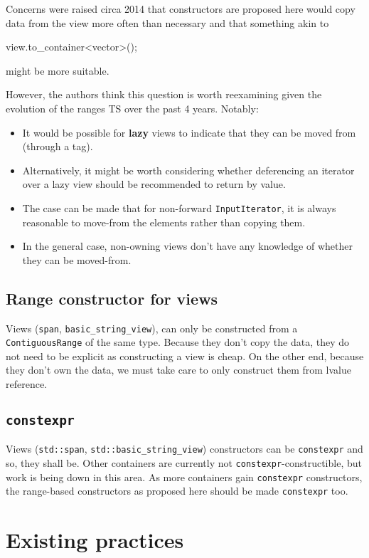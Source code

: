 \documentclass{wg21}
\newcommand{\cc}[1]{\texttt{#1}}
\begin{document}
Concerns were raised circa 2014 that constructors are proposed here would copy data from the view more often than necessary and that something akin to
\begin{codeblock}
view.to_container<vector>();
\end{codeblock}
might be more suitable.

However, the authors think this question is worth reexamining given the evolution of the ranges TS over the past 4 years.
Notably:
\begin{itemize}
	\item It would be possible for \textbf{lazy} views to indicate that they can be moved from (through a tag).
	\item Alternatively, it might be worth considering whether deferencing an iterator over a lazy view should be recommended to return by value.
	\item The case can be made that for non-forward \cc{InputIterator}, it is always reasonable to move-from the elements rather than copying them.
	\item In the general case, non-owning views don't have any knowledge of whether they can be moved-from.
\end{itemize}



\subsection{Range constructor for views}

Views (\cc{span}, \cc{basic_string_view}), can only be constructed from a \cc{ContiguousRange} of the same type.
Because they don't copy the data, they do not need to be explicit as constructing a view is cheap.
On the other end, because they don't own the data, we must take care to only construct them from lvalue reference.

\subsection{\cc{constexpr}}

Views (\cc{std::span}, \cc{std::basic_string_view}) constructors can be \cc{constexpr} and so, they shall be.
Other containers are currently not \cc{constexpr}-constructible, but work is being down in this area.
As more containers gain \cc{constexpr} constructors, the range-based constructors as proposed here should be made \cc{constexpr} too.

\section{Existing practices}
\end{document}
